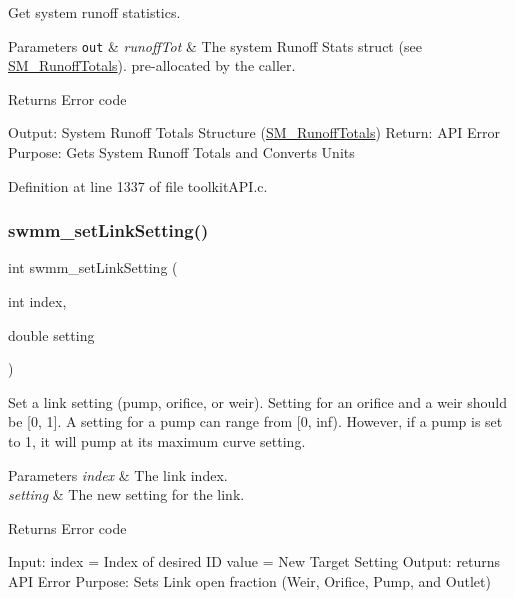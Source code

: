 Get system runoff statistics. 


\begin{DoxyParams}[1]{Parameters}
\mbox{\tt out}  & {\em runoff\+Tot} & The system Runoff Stats struct (see \hyperlink{struct_s_m___runoff_totals}{S\+M\+\_\+\+Runoff\+Totals}). pre-\/allocated by the caller. \\
\hline
\end{DoxyParams}
\begin{DoxyReturn}{Returns}
Error code
\end{DoxyReturn}
Output\+: System Runoff Totals Structure (\hyperlink{struct_s_m___runoff_totals}{S\+M\+\_\+\+Runoff\+Totals}) Return\+: A\+PI Error Purpose\+: Gets System Runoff Totals and Converts Units 

Definition at line 1337 of file toolkit\+A\+P\+I.\+c.

\mbox{\label{group__tkfuncs_gab44d2b1c21a6f750b0ce4c48ba16be81}} 
\subsubsection{\texorpdfstring{swmm\+\_\+set\+Link\+Setting()}{swmm\_setLinkSetting()}}
{\footnotesize\ttfamily int swmm\+\_\+set\+Link\+Setting (\begin{DoxyParamCaption}\item[{int}]{index,  }\item[{double}]{setting }\end{DoxyParamCaption})}



Set a link setting (pump, orifice, or weir). Setting for an orifice and a weir should be \mbox{[}0, 1\mbox{]}. A setting for a pump can range from \mbox{[}0, inf). However, if a pump is set to 1, it will pump at its maximum curve setting. 


\begin{DoxyParams}{Parameters}
{\em index} & The link index. \\
\hline
{\em setting} & The new setting for the link. \\
\hline
\end{DoxyParams}
\begin{DoxyReturn}{Returns}
Error code
\end{DoxyReturn}
Input\+: index = Index of desired ID value = New Target Setting Output\+: returns A\+PI Error Purpose\+: Sets Link open fraction (Weir, Orifice, Pump, and Outlet) 

